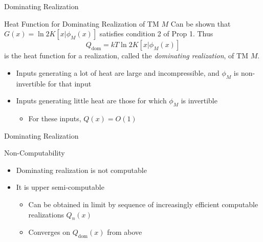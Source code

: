 \documentclass{beamer}
\begin{document}

\begin{frame}{Dominating Realization}
\begin{block}{Heat Function for Dominating Realization of TM $M$}
Can be shown that $G(x) = \ln 2K[x|\phi_M(x)]$ satisfies condition 2 of Prop 1. Thus
\begin{equation*}
    Q_\text{dom} = kT\ln 2K[x|\phi_M(x)]
\end{equation*}
is the heat function for a realization, called the \textit{dominating realization}, of TM $M$.
\begin{itemize}
    \item Inputs generating a lot of heat are large and incompressible, and $\phi_M$ is non-invertible for that input
    \item Inputs generating little heat are those for which $\phi_M$ is invertible
    \begin{itemize}
        \item For these inputs, $Q(x) = O(1)$
    \end{itemize}
\end{itemize}
\end{block}
\end{frame}

\begin{frame}{Dominating Realization}
\begin{block}{Non-Computability}
    \begin{itemize}
        \item Dominating realization is not computable
        \item It is upper semi-computable
        \begin{itemize}
            \item Can be obtained in limit by sequence of increasingly efficient computable realizations $Q_n(x)$
            \item Converges on $Q_\text{dom}(x)$ from above
        \end{itemize}
    \end{itemize}
    \end{block}
\end{frame}
\end{document}
